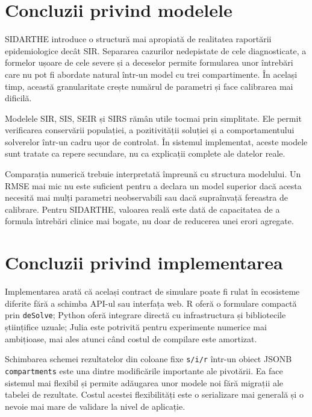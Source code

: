 {}
\section*{Concluzii privind modelele}
\label{sec:concluzii_modele}

SIDARTHE introduce o structură mai apropiată de realitatea raportării
epidemiologice decât SIR. Separarea cazurilor nedepistate de cele diagnosticate,
a formelor ușoare de cele severe și a deceselor permite formularea
unor întrebări care nu pot fi abordate natural într-un model cu trei
compartimente. În același timp, această granularitate crește numărul de parametri
și face calibrarea mai dificilă.

Modelele SIR, SIS, SEIR și SIRS rămân utile tocmai prin simplitate. Ele
permit verificarea conservării populației, a pozitivității soluției și a
comportamentului solverelor într-un cadru ușor de controlat. În sistemul
implementat, aceste modele sunt tratate ca repere secundare, nu ca explicații
complete ale datelor reale.

Comparația numerică trebuie interpretată împreună cu structura modelului. Un
RMSE mai mic nu este suficient pentru a declara un model superior dacă acesta
necesită mai mulți parametri neobservabili sau dacă supraînvață fereastra de
calibrare. Pentru SIDARTHE, valoarea reală este dată de capacitatea de a formula
întrebări clinice mai bogate, nu doar de reducerea unei erori agregate.

{}
\section*{Concluzii privind implementarea}
\label{sec:concluzii_implementare}

Implementarea arată că același contract de simulare poate fi rulat în ecosisteme
diferite fără a schimba API-ul sau interfața web. R oferă o formulare compactă
prin \texttt{deSolve}; Python oferă integrare directă cu infrastructura și
bibliotecile științifice uzuale; Julia este potrivită pentru experimente numerice
mai ambițioase, mai ales atunci când costul de compilare este amortizat.

Schimbarea schemei rezultatelor din coloane fixe \texttt{s/i/r} într-un obiect
JSONB \texttt{compartments} este una dintre modificările importante ale pivotării.
Ea face sistemul mai flexibil și permite adăugarea unor modele noi fără migrații
ale tabelei de rezultate. Costul acestei flexibilități este o serializare mai
generală și o nevoie mai mare de validare la nivel de aplicație.

